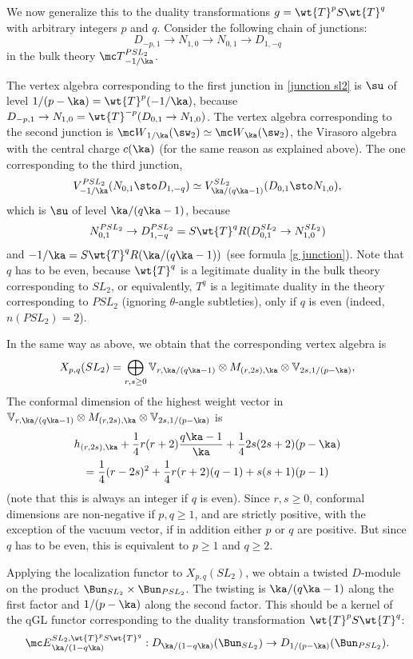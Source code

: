 \documentclass[11pt,reqno]{amsart}
\theoremstyle{plain}
\numberwithin{equation}{section}
\theoremstyle{definition}
\begin{document}
We now generalize this to the duality transformations $g = \wt{T}^{p}
S \wt{T}^q$ with arbitrary integers $p$ and $q$. Consider the
following chain of junctions:
\begin{equation}    \label{junction sl2}
D_{-p,1} \to N_{1,0} \to N_{0,1} \to D_{1,-q}
\end{equation}
in the bulk theory ${\mc T}^{PSL_2}_{-1/\ka}$.

The vertex algebra corresponding to the first junction in
\eqref{junction sl2} is $\su$ of level $1/(p-\ka) =
\wt{T}^{p}(-1/\ka)$, because $D_{-p,1} \to N_{1,0} = \wt{T}^{-p}(D_{0,1}
\to N_{1,0})$. The vertex algebra corresponding to the second junction
is ${\mc W}_{1/\ka}(\sw_2) \simeq {\mc W}_\ka(\sw_2)$, the Virasoro
algebra with the central charge $c(\ka)$ (for the same reason as
explained above). The one corresponding to the third junction,
$$
V^{PSL_2}_{-1/\ka}(N_{0,1} \sto D_{1,-q}) \simeq
V^{SL_2}_{\ka/(q\ka-1)}(D_{0,1} \sto N_{1,0}),
$$
which is $\su$ of level $\ka/(q\ka-1)$, because
$$
N^{PSL_2}_{0,1} \to D^{PSL_2}_{1,-q} =
S\wt{T}^qR(D^{SL_2}_{0,1} \to N^{SL_2}_{1,0})
$$
and $-1/\ka = S\wt{T}^qR(\ka/(q\ka-1))$ (see formula \eqref{g
  junction}). Note that $q$ has to be even, because $\wt{T}^q$ is a
legitimate duality in the bulk theory corresponding to $SL_2$, or
equivalently, $T^q$ is a legitimate duality in the theory
corresponding to $PSL_2$ (ignoring $\theta$-angle subtleties), only if
$q$ is even (indeed, $n(PSL_2)=2$).

In the same way as above, we obtain that the corresponding vertex
algebra is
$$
X_{p,q}(SL_2) = \bigoplus_{r,s\geq 0} {\mathbb V}_{r,\ka/(q\ka-1)}
\otimes M_{(r,2s),\ka} \otimes {\mathbb V}_{2s,1/(p-\ka)},
$$
The conformal dimension of the highest weight vector in ${\mathbb
  V}_{r,\ka/(q\ka-1)} \otimes M_{(r,2s),\ka} \otimes {\mathbb
  V}_{2s,1/(p-\ka)}$ is
\begin{multline*}
h_{(r,2s),\ka} + \frac{1}{4}r(r+2) \frac{q\ka-1}{\ka} +
\frac{1}{4}2s(2s+2)(p-\ka) \\ = \frac{1}{4}(r-2s)^2 +
\frac{1}{4}r(r+2)(q-1) + s(s+1)(p-1)
\end{multline*}
(note that this is always an integer if $q$ is even). Since $r,s \geq
0$, conformal dimensions are non-negative if $p, q \geq 1$, and are
strictly positive, with the exception of the vacuum vector, if in
addition either $p$ or $q$ are positive. But since $q$ has to be even,
this is equivalent to $p\geq 1$ and $q\geq 2$.

Applying the localization functor to $X_{p,q}(SL_2)$, we obtain a
twisted $D$-module on the product $\Bun_{SL_2} \times
\Bun_{PSL_2}$. The twisting is $\ka/(q\ka-1)$ along the first factor
and $1/(p-\ka)$ along the second factor. This should be a kernel of
the qGL functor corresponding to the duality transformation
$\wt{T}^{p} S \wt{T}^q$:
$$
{\mc E}^{SL_2,\wt{T}^{p} S \wt{T}^q}_{\ka/(1-q\ka)}:
D_{\ka/(1-q\ka)}(\Bun_{SL_2}) \to D_{1/(p-\ka)}(\Bun_{PSL_2}).
$$
\end{document}
